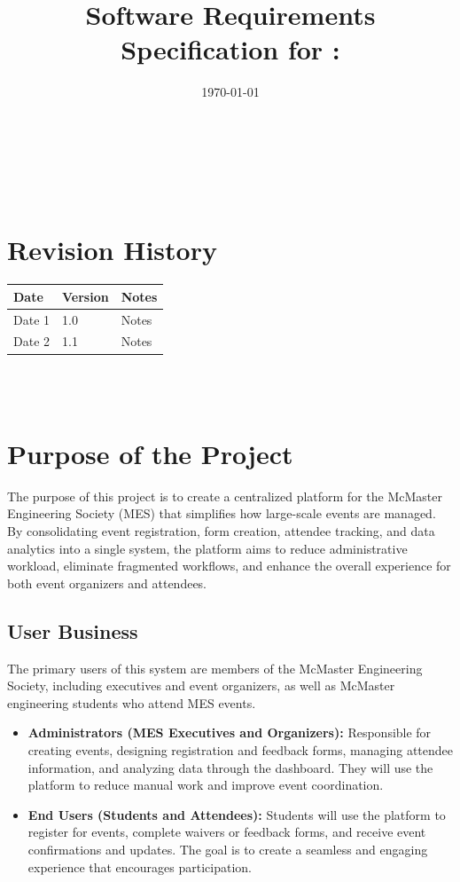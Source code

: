 \documentclass[12pt]{article}
\begin{document}
\title{Software Requirements Specification for \progname: \prjdesc}
\author{\authname}
\date{\today}

\maketitle

~\newpage


\tableofcontents

~\newpage

\section*{Revision History}

\begin{tabularx}{\textwidth}{p{3cm}p{2cm}X}
\toprule {\textbf{Date}} & {\textbf{Version}} & {\textbf{Notes}}\\
\midrule
Date 1 & 1.0 & Notes\\
Date 2 & 1.1 & Notes\\
\bottomrule
\end{tabularx}

~\\

~\newpage
\section{Purpose of the Project}

The purpose of this project is to create a centralized platform for the McMaster Engineering Society (MES) that simplifies how large-scale events are managed. By consolidating event registration, form creation, attendee tracking, and data analytics into a single system, the platform aims to reduce administrative workload, eliminate fragmented workflows, and enhance the overall experience for both event organizers and attendees.

\subsection{User Business}

The primary users of this system are members of the McMaster Engineering Society, including executives and event organizers, as well as McMaster engineering students who attend MES events.  

\begin{itemize}
    \item \textbf{Administrators (MES Executives and Organizers):} Responsible for creating events, designing registration and feedback forms, managing attendee information, and analyzing data through the dashboard. They will use the platform to reduce manual work and improve event coordination.
    \item \textbf{End Users (Students and Attendees):} Students will use the platform to register for events, complete waivers or feedback forms, and receive event confirmations and updates. The goal is to create a seamless and engaging experience that encourages participation.
\end{itemize}
\end{document}
